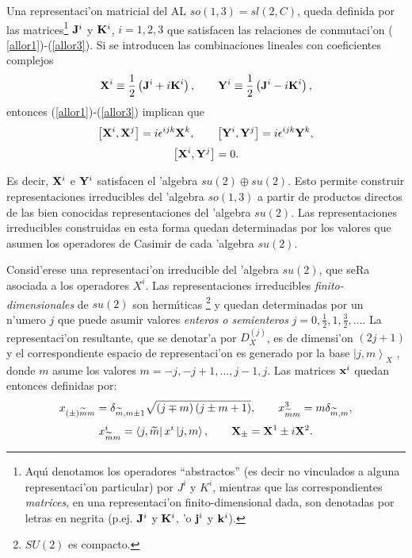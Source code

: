 Una representaci'on matricial del AL $so(1,3)=sl(2,C)$, queda definida
por las matrices\footnote{%
Aqu{\'\i} denotamos los operadores ``abstractos'' (es decir no vinculados a
alguna representaci'on particular) por $J^{i}$ y $K^{i}$, mientras que
las correspondientes {\em matrices}, en una representaci'on
finito-dimensional dada, son denotadas por letras en negrita (p.ej. ${\bf J}%
^{i}$ y ${\bf K}^{i}$, 'o ${\bf j}^{i}$ y ${\bf k}^{i}$).} ${\bf J}^{i}$
y ${\bf K}^{i}$, $i=1,2,3$ que satisfacen las relaciones de conmutaci'on (%
\ref{allor1})-(\ref{allor3}). Si se introducen las combinaciones lineales
con coeficientes complejos 
\begin{equation}
{\bf X}^{i}\equiv \frac{1}{2}\left( {\bf J}^{i}+i{\bf K}^{i}\right) ,\qquad 
{\bf Y}^{i}\equiv \frac{1}{2}\left( {\bf J}^{i}-i{\bf K}^{i}\right) ,
\label{defxy}
\end{equation}
entonces (\ref{allor1})-(\ref{allor3}) implican que 
\begin{equation}
\left[ {\bf X}^{i},{\bf X}^{j}\right] =i\epsilon ^{ijk}{\bf X}^{k},\qquad 
\left[ {\bf Y}^{i},{\bf Y}^{j}\right] =i\epsilon ^{ijk}{\bf Y}^{k}, 
\end{equation}
\begin{equation}
\left[ {\bf X}^{i},{\bf Y}^{j}\right] =0. 
\end{equation}

Es decir, ${\bf X}^{i}$ e ${\bf Y}^{i}$ satisfacen el 'algebra $%
su(2)\oplus su(2)$. Esto permite construir representaciones irreducibles del
'algebra $so(1,3)$ a partir de productos directos de las bien conocidas
representaciones del 'algebra $su(2)$. Las representaciones irreducibles
construidas en esta forma quedan determinadas por los valores que asumen los
operadores de Casimir de cada 'algebra $su(2)$.

Consid'erese una representaci'on irreducible del 'algebra $su(2)$,
que seRa asociada a los operadores $X^{i}$. Las representaciones
irreducibles {\em finito-dimensionales} de $su(2)$ son herm{\'{\i }}ticas%
\footnote{$SU(2)$ es compacto.} y quedan determinadas por un n'umero $j$
que puede asumir valores {\em enteros o semienteros} $j=0,\frac{1}{2},1,%
\frac{3}{2},\ldots $. La representaci'on resultante, que se denotar'a
por $D_{X}^{(j)}$, es de dimensi'on $(2j+1)$ y el correspondiente espacio
de representaci'on es generado por la base $\left| j,m\right\rangle _{X}$%
, donde $m$ asume los valores $m=-j,-j+1,\ldots ,j-1,j$. Las matrices ${\bf x%
}^{i}$ quedan entonces definidas por: 
\begin{equation}
x_{(\pm )\widetilde{m}m}=\delta _{\widetilde{m},m\pm 1}\sqrt{\left( j\mp
m\right) \left( j\pm m+1\right) },\qquad x_{\widetilde{m}m}^3=m\delta _{%
\widetilde{m},m},  \label{x1}
\end{equation}
\begin{equation}
x_{\widetilde{m}m}^{i}=\left\langle j,\widetilde{m}\right| x^{i}\left|
j,m\right\rangle ,\qquad {\bf X}_{\pm }={\bf X}^1\pm i{\bf X}^2.
\label{x2}
\end{equation}

